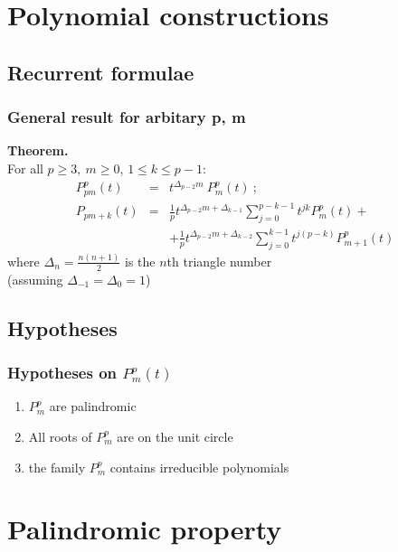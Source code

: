 \section{Polynomial constructions}


\subsection{Recurrent formulae}


\begin{frame}
    \frametitle{General result for arbitary p, m}
     {\bf Theorem.}\\ \bigskip
     For all $p \ge 3,\ m \ge 0$, $1 \le k \le p-1$:
     \bigskip 
     \begin{eqnarray*} 
     P_{pm}^p(t) & = &  t^{\Delta_{p-2} m}\ P_m^p(t)\ ; \\
     P_{pm+k}(t) & = &  \frac{1}{p} t^{\Delta_{p-2} m + \Delta_{k-1}}\sum\limits_{j=0}^{p-k-1} t^{jk} P_m^p(t) + \\
     & & + \frac{1}{p} t^{\Delta_{p-2} m + \Delta_{k-2}}\sum\limits_{j=0}^{k-1} t^{j(p-k)} P_{m+1}^p(t) 
      \end{eqnarray*}
     where $\Delta_n = \frac{n(n+1)}{2}$ is the $n$th triangle number\\
     (assuming $\Delta_{-1}=\Delta_0 = 1$)
\end{frame}


\subsection{Hypotheses}

\begin{frame}
    \frametitle{Hypotheses on $P_m^p(t)$}
  \begin{enumerate}
   \item $P_m^p$ are palindromic
   \item All roots of $P_m^p$ are on the unit circle
   \item the family $P_m^p$ contains irreducible polynomials
  \end{enumerate}
\end{frame}

\section{Palindromic property}
